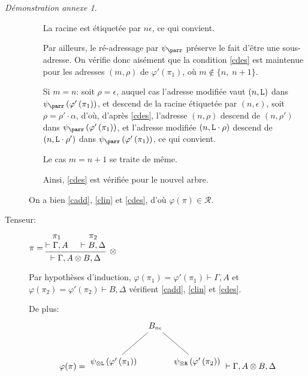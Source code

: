 \documentclass[11pt,a4paper]{article}
\theoremstyle{plain}
\theoremstyle{definition}
\theoremstyle{remark}
\newtheorem{demonstrationappendix}{Démonstration annexe}
\newcommand*{\tensor}{\otimes}
\newcommand*{\namedproofv}[2]{\hypo{#1}\infer[no rule]{1}{\vdash #2}}
\newcommand*{\tensorv}[1]{\infer{2}[\ensuremath{\tensor}]{\vdash #1}}
\newcommand*{\someadd}{\rho}
\newcommand*{\someproof}{\pi}
\newcommand*{\sequent}{\Gamma}
\newcommand*{\sequentbis}{\Delta}
\newcommand*{\Left}{\textnormal{\texttt{L}}}
\newcommand*{\Right}{\textnormal{\texttt{R}}}
\newcommand*{\representations}{\ensuremath{\mathcal{R}}}
\newcommand*{\encode}{\ensuremath{\varphi}}
\begin{document}
\begin{demonstrationappendix}
\begin{description}
\begin{enumerate}
        La racine est étiquetée par $n \epsilon$, ce qui convient.

        Par ailleurs, le ré-adressage par $\psi_\parr$ préserve le fait d'être une sous-adresse. On vérifie donc aisément que la condition \ref{cdes} est maintenue pour les adresses $(m, \someadd)$ de $\encode' \left( \pi_1 \right)$, où $m \notin \{ n, \; n+1 \}$.
        
        Si $m = n$: soit $\someadd = \epsilon$, auquel cas l'adresse modifiée vaut $(n, \Left)$ dans $\psi_\parr \left( \encode' \left( \pi_1 \right) \right)$, et descend de la racine étiquetée par $(n, \epsilon)$, soit $\someadd = \someadd' \cdot \alpha$, d'où, d'après \ref{cdes}, l'adresse $(n, \someadd)$ descend de $(n, \someadd')$ dans $\psi_\parr \left( \encode' \left( \pi_1 \right) \right)$, et l'adresse modifiée $(n, \Left \cdot \someadd)$ descend de $(n, \Left \cdot \someadd')$ dans $\psi_\parr \left( \encode' \left( \pi_1 \right) \right)$, ce qui convient.

        Le cas $m = n+1$ se traite de même.

        Ainsi, \ref{cdes} est vérifiée pour le nouvel arbre.
    \end{enumerate} 

    On a bien \ref{cadd}, \ref{clin} et \ref{cdes}, d'où $\encode \left( \someproof \right) \in \representations$.

     \item[Tenseur:] $\someproof =
    \begin{prooftree}
      \namedproofv{\pi_1}{\sequent, A}
      \namedproofv{\pi_2}{B, \sequentbis}
      \tensorv{\sequent, A \tensor B, \sequentbis}
    \end{prooftree}$

    Par hypothèses d'induction, $\encode \left( \pi_1 \right) = \encode ' \left( \pi_1 \right) \vdash \sequent, A$ et $\encode \left( \pi_2 \right) = \encode ' \left( \pi_2 \right) \vdash B, \sequentbis$ vérifient \ref{cadd}, \ref{clin} et \ref{cdes}.
    
    De plus:
    \begin{equation*}
    \encode ( \someproof ) = \begin{tikzpicture}%
    [level 1/.style={sibling distance=3.5cm}]
    \node {$B_{n \epsilon}$}
        child {node {$\psi_{\tensor\Left} \left( \encode' \left( \pi_1 \right) \right)$}}
        child {node {$\psi_{\tensor\Right} \left( \encode' \left( \pi_2 \right) \right)$}
    };
    \end{tikzpicture} \vdash \sequent, A \tensor B, \sequentbis
    \end{equation*}


\end{description}
\end{demonstrationappendix}
\end{document}
